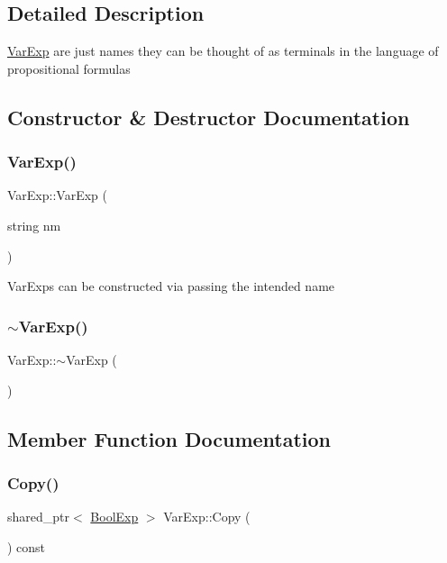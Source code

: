 \subsection{Detailed Description}
\mbox{\hyperlink{classVarExp}{Var\+Exp}} are just names they can be thought of as terminals in the language of propositional formulas 

\subsection{Constructor \& Destructor Documentation}
\mbox{\label{classVarExp_a8281aeafbde537140bacfed1a894e889}} 
\subsubsection{\texorpdfstring{Var\+Exp()}{VarExp()}}
{\footnotesize\ttfamily Var\+Exp\+::\+Var\+Exp (\begin{DoxyParamCaption}\item[{string}]{nm }\end{DoxyParamCaption})}

Var\+Exps can be constructed via passing the intended name \mbox{\label{classVarExp_a5e1198cc9abe533d0a606e27d7b20e75}} 
\subsubsection{\texorpdfstring{$\sim$\+Var\+Exp()}{~VarExp()}}
{\footnotesize\ttfamily Var\+Exp\+::$\sim$\+Var\+Exp (\begin{DoxyParamCaption}{ }\end{DoxyParamCaption})\hspace{0.3cm}{\ttfamily [virtual]}}



\subsection{Member Function Documentation}
\mbox{\label{classVarExp_ad93ffa6aa927bc41c9765bc37b4d0a63}} 
\subsubsection{\texorpdfstring{Copy()}{Copy()}}
{\footnotesize\ttfamily shared\+\_\+ptr$<$ \mbox{\hyperlink{classBoolExp}{Bool\+Exp}} $>$ Var\+Exp\+::\+Copy (\begin{DoxyParamCaption}{ }\end{DoxyParamCaption}) const\hspace{0.3cm}{\ttfamily [virtual]}}

